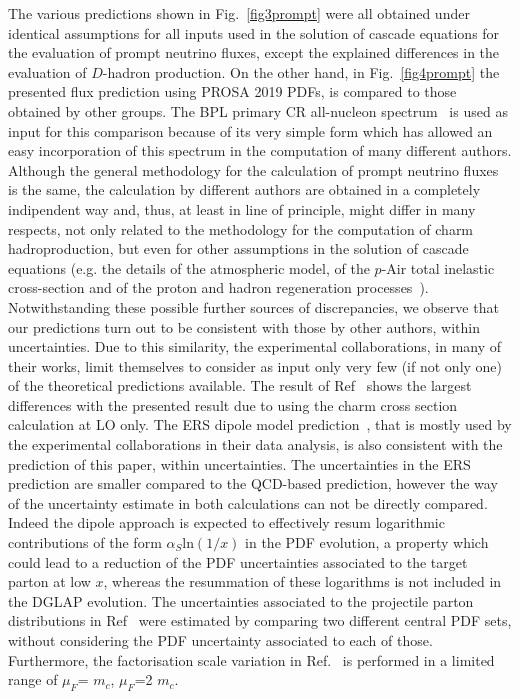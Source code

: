 \documentclass[12pt]{article}
\begin{document}
The various predictions shown in Fig.~\ref{fig3prompt} were all obtained under identical assumptions for all inputs used in the solution of cascade equations for the evaluation of prompt neutrino fluxes, except the explained differences in the evaluation of $D$-hadron production. On the other hand, in Fig.~\ref{fig4prompt} the presented flux prediction using PROSA 2019 PDFs, is compared to those obtained by other groups. The BPL primary CR all-nucleon spectrum~\cite{Gaisser:2016uoy} is used as input for this comparison because of its very simple form which has allowed an easy incorporation of this spectrum in the computation of many different authors. Although the general methodology for the calculation of prompt neutrino fluxes is the same, the calculation by different authors are obtained in a completely indipendent way and, thus, at least in line of principle, might differ in many respects, not only related to the methodology for the computation of charm hadroproduction, but even for other assumptions in the solution of cascade equations (e.g. the details of the atmospheric model, of the $p$-Air total inelastic cross-section and of the proton and hadron regeneration processes~\cite{Garzelli:2015psa}). Notwithstanding these possible further sources of discrepancies, we observe that our predictions turn out to be consistent with those by other authors, within uncertainties. Due to this similarity, the experimental collaborations, in many of their works, limit themselves to consider as input only very few (if not only one) of the theoretical predictions available. The result of Ref~\cite{Gondolo:1995fq} shows the largest differences with the presented result due to using the charm cross section calculation at LO only. The ERS dipole model prediction~\cite{Enberg:2008te}, that is mostly used by the experimental collaborations in their data analysis, is also consistent with the prediction of this paper, within uncertainties. The uncertainties in the ERS prediction are smaller compared to the QCD-based prediction, however the way of the uncertainty estimate in both calculations can not be directly compared. Indeed the dipole approach is expected to effectively resum logarithmic contributions of the form $\alpha_S\mathrm{ln}(1/x)$ in the PDF evolution, a property which could lead to a reduction of the PDF uncertainties associated to the target parton at low $x$, whereas the resummation of these logarithms is not included in the DGLAP evolution.
The uncertainties associated to the projectile parton distributions in Ref~\cite{Enberg:2008te} were estimated by comparing two different central PDF sets, without considering the PDF uncertainty associated to each of those. Furthermore, the factorisation scale variation in Ref.~\cite{Enberg:2008te} is performed in a limited range of $\mu_F$= $m_c$, $\mu_F$=2 $m_c$.
\end{document}
